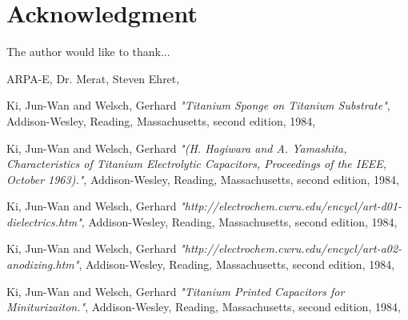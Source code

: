 \documentclass[journal]{IEEEtran}
\begin{document}
\section*{Acknowledgment}

The author would like to thank...

ARPA-E,
Dr. Merat,
Steven Ehret,

\ifCLASSOPTIONcaptionsoff
  \newpage
\fi


%
\begin{thebibliography}{1}

 Ki, Jun-Wan and Welsch, Gerhard \emph{"Titanium Sponge on Titanium Substrate"}, Addison-Wesley, Reading,
Massachusetts, second edition, 1984,

 Ki, Jun-Wan and Welsch, Gerhard \emph{"(H. Hagiwara and A. Yamashita, Characteristics of Titanium Electrolytic Capacitors, Proceedings of the IEEE, October 1963)."}, Addison-Wesley, Reading,
Massachusetts, second edition, 1984,

 Ki, Jun-Wan and Welsch, Gerhard \emph{"http://electrochem.cwru.edu/encycl/art-d01-dielectrics.htm"}, Addison-Wesley, Reading,
Massachusetts, second edition, 1984,

 Ki, Jun-Wan and Welsch, Gerhard \emph{"http://electrochem.cwru.edu/encycl/art-a02-anodizing.htm"}, Addison-Wesley, Reading,
Massachusetts, second edition, 1984,

 Ki, Jun-Wan and Welsch, Gerhard \emph{"Titanium Printed Capacitors for Miniturizaiton."}, Addison-Wesley, Reading,
Massachusetts, second edition, 1984,

\end{thebibliography}
\end{document}
